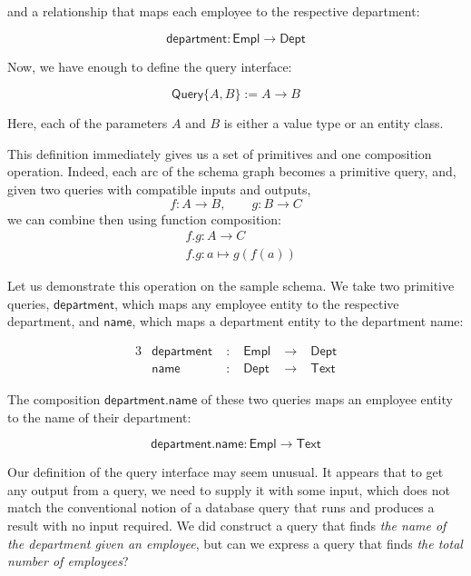 and a relationship that maps each employee to the respective department:

\begin{equation*}
\textsf{department}: \textsf{Empl} \to \textsf{Dept}
\end{equation*}

Now, we have enough to define the query interface:

\begin{equation*}
\textsf{Query}\{A,B\} := A \to B
\end{equation*}

Here, each of the parameters $A$ and $B$ is either a value type or an entity
class.

This definition immediately gives us a set of primitives and one composition
operation.  Indeed, each arc of the schema graph becomes a primitive query,
and, given two queries with compatible inputs and outputs,
\begin{equation*}
f: A \to B, \qquad g: B \to C
\end{equation*}
we can combine then using function composition:
\begin{align*}
&f{.}g : A \to C \\
&f{.}g : a \mapsto g(f(a))
\end{align*}

Let us demonstrate this operation on the sample schema.  We take two primitive
queries, $\textsf{department}$, which maps any employee entity to the
respective department, and $\textsf{name}$, which maps a department entity to
the department name:

\begin{alignat*}{3}
& \textsf{department} &\;:\;& \textsf{Empl} &\;\to\;& \textsf{Dept} \\
& \textsf{name} &\;:\;& \textsf{Dept} &\;\to\;& \textsf{Text}
\end{alignat*}

The composition $\textsf{department}.\textsf{name}$ of these two
queries maps an employee entity to the name of their department:

\begin{equation*}
\textsf{department}{.}\textsf{name}: \textsf{Empl} \to \textsf{Text}
\end{equation*}

Our definition of the query interface may seem unusual.  It appears that to get
any output from a query, we need to supply it with some input, which does not
match the conventional notion of a database query that runs and produces a
result with no input required.  We did construct a query that finds \emph{the
name of the department given an employee}, but can we express a query that
finds \emph{the total number of employees}?

